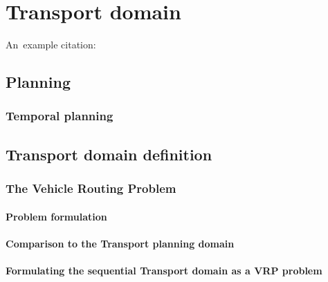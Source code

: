 \chapter{Transport domain}

An~example citation: \cite{Ghallab2004}

\section{Planning}

\subsection{Temporal planning}

\section{Transport domain definition}


\subsection{The Vehicle Routing Problem}

\subsubsection{Problem formulation}

\subsubsection{Comparison to the Transport planning domain}

\subsubsection{Formulating the sequential Transport domain as a VRP problem}

